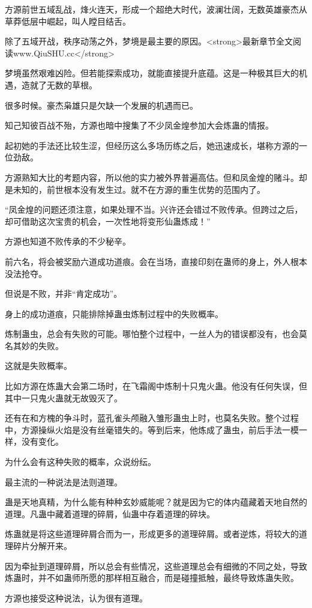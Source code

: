 \begin{this_body}
方源前世五域乱战，烽火连天，形成一个超绝大时代，波澜壮阔，无数英雄豪杰从草莽低层中崛起，叫人瞠目结舌。

除了五域开战，秩序动荡之外，梦境是最主要的原因。<strong>最新章节全文阅读www.QiuSHU.cc</strong>

梦境虽然艰难凶险。但若能探索成功，就能直接提升底蕴。这是一种极其巨大的机遇，造就了无数的草根。

很多时候。豪杰枭雄只是欠缺一个发展的机遇而已。

知己知彼百战不殆，方源也暗中搜集了不少凤金煌参加大会炼蛊的情报。

起初她的手法还比较生涩，但经历这么多场历练之后，她迅速成长，堪称方源的一位劲敌。

方源熟知大比的考题内容，所以他的实力被外界普遍高估。但和凤金煌的赌斗。却是未知的，前世根本没有发生过。就不在方源的重生优势的范围内了。

“凤金煌的问题还须注意，如果处理不当。兴许还会错过不败传承。但跨过之后，却可借助这次宝贵的机会，一次性地将变形仙蛊炼成！”

方源也知道不败传承的不少秘辛。

前六名，将会被奖励六道成功道痕。会在当场，直接印刻在蛊师的身上，外人根本没法抢夺。

但说是不败，并非“肯定成功”。

身上的成功道痕，只能排除掉蛊虫炼制过程中的失败概率。

炼制蛊虫，总会有失败的可能。哪怕整个过程中，一丝人为的错误都没有，也会莫名其妙的失败。

这就是失败概率。

比如方源在炼蛊大会第二场时，在飞霜阁中炼制十只鬼火蛊。他没有任何失误，但其中一只鬼火蛊就无故毁灭了。

还有在和方槐的争斗时，蓝孔雀头颅融入雏形蛊虫上时，也莫名失败。整个过程中，方源操纵火焰是没有丝毫错失的。等到后来，他炼成了蛊虫，前后手法一模一样，没有变化。

为什么会有这种失败的概率，众说纷纭。

最主流的一种说法是法则道理。

蛊是天地真精，为什么能有种种玄妙威能呢？就是因为它的体内蕴藏着天地自然的道理。凡蛊中藏着道理的碎屑，仙蛊中存着道理的碎块。

炼蛊就是将这些道理碎屑合而为一，形成更多的道理碎屑。或者逆炼，将较大的道理碎片分解开来。

因为牵扯到道理碎屑，所以总会有些情况，这些道理总会有细微的不同之处，导致炼蛊时，并不如蛊师所愿的那样相互融合，而是碰撞抵触，最终导致炼蛊失败。

方源也接受这种说法，认为很有道理。


\end{this_body}
